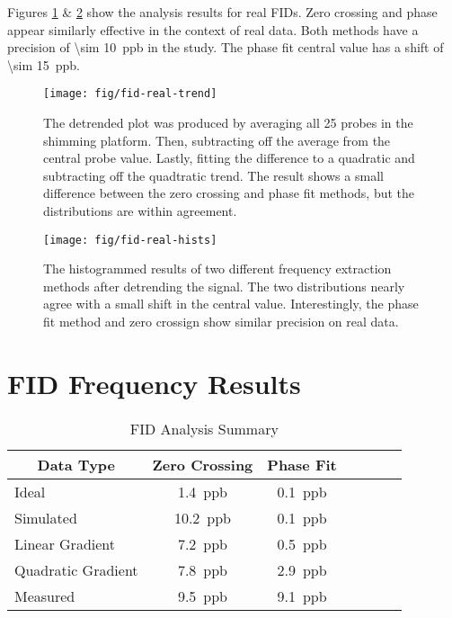 Figures \ref{fig:fid-real-trend} \& \ref{fig:fid-real-hists} show the analysis results for real FIDs.  Zero crossing and phase appear similarly effective in the context of real data.  Both methods have a precision of \SI{\sim 10}{ppb} in the study.  The phase fit central value has a shift of \SI{\sim 15}{ppb}.

\begin{figure}
\label{fig:fid-real-trend}
\centering
\texttt{[image: fig/fid-real-trend]}
\caption{The detrended plot was produced by averaging all 25 probes in the shimming platform.  Then, subtracting off the average from the central probe value.  Lastly, fitting the difference to a quadratic and subtracting off the quadtratic trend.  The result shows a small difference between the zero crossing and phase fit methods, but the distributions are within agreement.}
\end{figure}

\begin{figure}
\label{fig:fid-real-hists}
\centering
\texttt{[image: fig/fid-real-hists]}
\caption{The histogrammed results of two different frequency extraction methods after detrending the signal.  The two distributions nearly agree with a small shift in the central value.  Interestingly, the phase fit method and zero crossign show similar precision on real data.}
\end{figure}

\section{FID Frequency Results}

\begin{table}[h]
\label{tab:fid-analysis-summary}
\caption{FID Analysis Summary}
\centering
\begin{tabular}{l c c c c c c}
    \hline
    \multicolumn{1}{c}{Data Type} & Zero Crossing & Phase Fit \\
    \hline
    Ideal                & \SI{1.4}{ppb}  & \SI{0.1}{ppb} \\
    Simulated            & \SI{10.2}{ppb} & \SI{0.1}{ppb} \\
    Linear Gradient      & \SI{7.2}{ppb}  & \SI{0.5}{ppb} \\
    Quadratic Gradient   & \SI{7.8}{ppb}  & \SI{2.9}{ppb} \\
    Measured             & \SI{9.5}{ppb}  & \SI{9.1}{ppb} \\
    \hline
\end{tabular}
\end{table}
